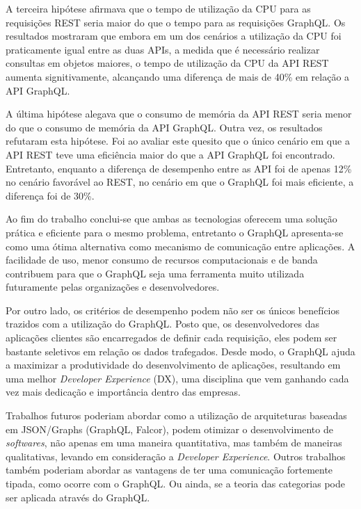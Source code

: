 A terceira hipótese afirmava que o tempo de utilização da CPU para as requisições REST seria maior do que o tempo para as requisições GraphQL. Os resultados mostraram que embora em um dos cenários a utilização da CPU foi praticamente igual entre as duas APIs, a medida que é necessário realizar consultas em objetos maiores, o tempo de utilização da CPU da API REST aumenta signitivamente, alcançando uma diferença de mais de 40\% em relação a API GraphQL.

A última hipótese alegava que o consumo de memória da API REST seria menor do que o consumo de memória da API GraphQL. Outra vez, os resultados refutaram esta hipótese. Foi ao avaliar este quesito que o único cenário em que a API REST teve uma eficiência maior do que a API GraphQL foi encontrado. Entretanto, enquanto a diferença de desempenho entre as API foi de apenas 12\% no cenário favorável ao REST, no cenário em que o GraphQL foi mais eficiente, a diferença foi de 30\%. 

Ao fim do trabalho conclui-se que ambas as tecnologias oferecem uma solução prática e eficiente para o mesmo problema, entretanto o GraphQL apresenta-se como uma ótima alternativa como mecanismo de comunicação entre aplicações. A facilidade de uso, menor consumo de recursos computacionais e de banda contribuem para que o GraphQL seja uma ferramenta muito utilizada futuramente pelas organizações e desenvolvedores. 

Por outro lado, os critérios de desempenho podem não ser os únicos benefícios trazidos com a utilização do GraphQL. Posto que, os desenvolvedores das aplicações clientes são encarregados de definir cada requisição, eles podem ser bastante seletivos em relação os dados trafegados. Desde modo, o GraphQL ajuda a maximizar a produtividade do desenvolvimento de aplicações, resultando em uma melhor \textit{Developer Experience} (DX), uma disciplina que vem ganhando cada vez mais dedicação e importância dentro das empresas.

Trabalhos futuros poderiam abordar como a utilização de arquiteturas baseadas em JSON/Graphs (GraphQL, Falcor), podem otimizar o desenvolvimento de \textit{softwares}, não apenas em uma maneira quantitativa, mas também de maneiras qualitativas, levando em consideração a \textit{Developer Experience}. Outros trabalhos também poderiam abordar as vantagens de ter uma comunicação fortemente tipada, como ocorre com o GraphQL. Ou ainda, se a teoria das categorias pode ser aplicada através do GraphQL.
